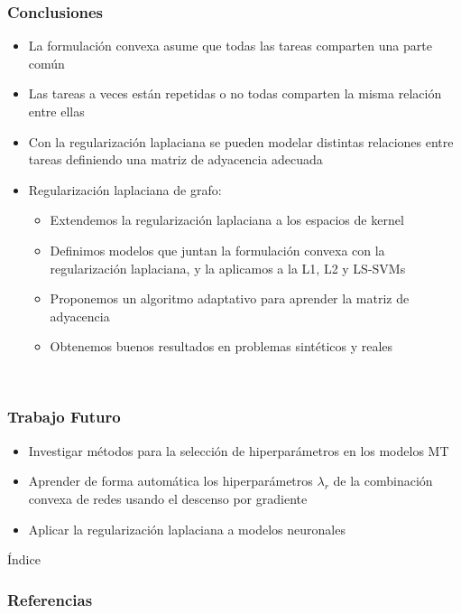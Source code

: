 \documentclass[aspectratio=43,spanish]{beamer}
\begin{document}
\begin{frame}
\frametitle{Conclusiones}
\begin{itemize}
      
      \item La formulación convexa asume que todas las tareas comparten una parte común
      \item Las tareas a veces están repetidas o no todas comparten la misma relación entre ellas
      \item Con la regularización laplaciana se pueden modelar distintas relaciones entre tareas definiendo una matriz de adyacencia adecuada
      \item Regularización laplaciana de grafo:
      \begin{itemize}
            \item Extendemos la regularización laplaciana a los espacios de kernel
            \item Definimos modelos que juntan la formulación convexa con la regularización laplaciana, y la aplicamos a la L1, L2 y LS-SVMs
            \item Proponemos un algoritmo adaptativo para aprender la matriz de adyacencia
            \item Obtenemos buenos resultados en problemas sintéticos y reales
      \end{itemize}
      \  
\end{itemize}
\end{frame}

\begin{frame}
      \frametitle{Trabajo Futuro}

      \begin{itemize}
            \item Investigar métodos para la selección de hiperparámetros en los modelos MT 
            \item Aprender de forma automática los hiperparámetros $\lambda_r$ de la combinación convexa de redes usando el descenso por gradiente
            \item Aplicar la regularización laplaciana a modelos neuronales
      \end{itemize}

\end{frame}

\backmatter

\begin{frame}{Índice}{}
      \tableofcontents
\end{frame}

\begin{frame}[allowframebreaks]
      \frametitle{Referencias}

      \printbibliography

\end{frame}
\end{document}

